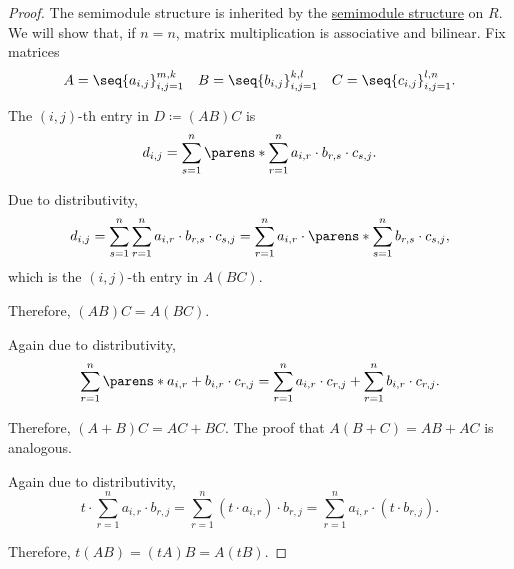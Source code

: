 \begin{proof}
  The semimodule structure is inherited by the \hyperref[thm:commutative_monoid_is_semimodule]{semimodule structure} on \( R \). We will show that, if \( n = n \), matrix multiplication is associative and bilinear. Fix matrices
  \begin{equation*}
    \begin{aligned}
      A = \seq{ a_{i,j} }_{i,j=1}^{m,k} && B = \seq{ b_{i,j} }_{i,j=1}^{k,l} && C = \seq{ c_{i,j} }_{i,j=1}^{l,n}.
    \end{aligned}
  \end{equation*}

   The \( (i, j) \)-th entry in \( D \coloneqq (AB)C \) is
  \begin{equation*}
    d_{i,j} = \sum_{s=1}^n \parens*{ \sum_{r=1}^n a_{i,r} \cdot b_{r,s} } \cdot c_{s,j}.
  \end{equation*}

  Due to distributivity,
  \begin{equation*}
    d_{i,j}
    =
    \sum_{s=1}^n \sum_{r=1}^n a_{i,r} \cdot b_{r,s} \cdot c_{s,j}
    =
    \sum_{r=1}^n a_{i,r} \cdot \parens*{ \sum_{s=1}^n b_{r,s} \cdot c_{s,j} },
  \end{equation*}
  which is the \( (i, j) \)-th entry in \( A(BC) \).

  Therefore, \( (AB)C = A(BC) \).

   Again due to distributivity,
  \begin{equation*}
    \sum_{r=1}^n \parens*{ a_{i,r} + b_{i,r} } \cdot c_{r,j}
    =
    \sum_{r=1}^n a_{i,r} \cdot c_{r,j} + \sum_{r=1}^n b_{i,r} \cdot c_{r,j}.
  \end{equation*}

  Therefore, \( (A + B)C = AC + BC \). The proof that \( A(B + C) = AB + AC \) is analogous.

   Again due to distributivity,
  \begin{equation*}
    t \cdot \sum_{r=1}^n a_{i,r} \cdot b_{r,j}
    =
    \sum_{r=1}^n (t \cdot a_{i,r}) \cdot b_{r,j}
    =
    \sum_{r=1}^n a_{i,r} \cdot (t \cdot b_{r,j}).
  \end{equation*}

  Therefore, \( t(AB) = (tA)B = A(tB) \).
\end{proof}

